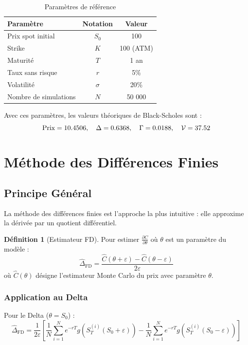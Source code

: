 \documentclass[a4paper,11pt]{article}
\theoremstyle{definition}
\newtheorem{definition}{Définition}[section]
\begin{document}
\begin{table}[H]
\centering
\begin{tabular}{lcc}
\toprule
\textbf{Paramètre} & \textbf{Notation} & \textbf{Valeur} \\
\midrule
Prix spot initial & $S_0$ & 100 \\
Strike & $K$ & 100 (ATM) \\
Maturité & $T$ & 1 an \\
Taux sans risque & $r$ & 5\% \\
Volatilité & $\sigma$ & 20\% \\
Nombre de simulations & $N$ & 50 000 \\
\bottomrule
\end{tabular}
\caption{Paramètres de référence}
\end{table}

Avec ces paramètres, les valeurs théoriques de Black-Scholes sont :
$$\text{Prix} = 10.4506, \quad \Delta = 0.6368, \quad \Gamma = 0.0188, \quad \mathcal{V} = 37.52$$

\section{Méthode des Différences Finies}

\subsection{Principe Général}

La méthode des différences finies est l'approche la plus intuitive : elle approxime la dérivée par un quotient différentiel.

\begin{definition}[Estimateur FD]
Pour estimer $\frac{\partial C}{\partial \theta}$ où $\theta$ est un paramètre du modèle :
$$\hat{\Delta}_{\text{FD}} = \frac{\hat{C}(\theta + \varepsilon) - \hat{C}(\theta - \varepsilon)}{2\varepsilon}$$
où $\hat{C}(\theta)$ désigne l'estimateur Monte Carlo du prix avec paramètre $\theta$.
\end{definition}

\subsubsection{Application au Delta}

Pour le Delta ($\theta = S_0$) :
$$\hat{\Delta}_{\text{FD}} = \frac{1}{2\varepsilon} \left[ \frac{1}{N}\sum_{i=1}^N e^{-rT} g\left(S_T^{(i)}(S_0 + \varepsilon)\right) - \frac{1}{N}\sum_{i=1}^N e^{-rT} g\left(S_T^{(i)}(S_0 - \varepsilon)\right) \right]$$
\end{document}
